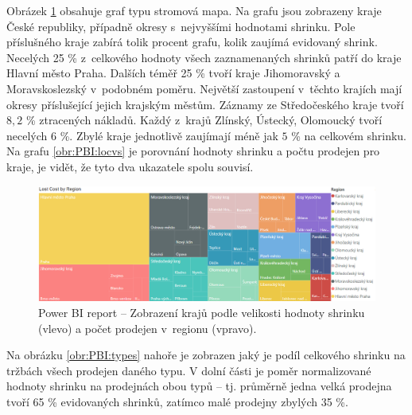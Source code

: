 Obrázek \ref*{obr:PBI:loc} obsahuje graf typu stromová mapa. Na grafu jsou zobrazeny kraje České republiky, případně okresy s~nejvyššími hodnotami shrinku. Pole příslušného kraje zabírá tolik procent grafu, kolik zaujímá evidovaný shrink. Necelých 25 \% z~celkového hodnoty všech zaznamenaných shrinků patří do kraje Hlavní město Praha. Dalších téměř 25 \% tvoří kraje Jihomoravský a Moravskoslezský v~podobném poměru. Největší zastoupení v~těchto krajích mají okresy příslušející jejich krajským městům. Záznamy ze Středočeského kraje tvoří $8{,}2$ \% ztracených nákladů. Každý z~krajů Zlínský, Ústecký, Olomoucký tvoří necelých $6$ \%. Zbylé kraje jednotlivě zaujímají méně jak $5$ \% na celkovém shrinku. Na grafu \ref*{obr:PBI:locvs} je porovnání hodnoty shrinku a počtu prodejen pro kraje, je vidět, že tyto dva ukazatele spolu souvisí.
\begin{figure}[h!]
    \centering
    \captionsetup{justification=centering}
    \includegraphics[width=\textwidth]{obrazky/PBI/location.png}
    \caption{Power BI report -- Zobrazení krajů podle velikosti hodnoty shrinku (vlevo) a počet prodejen v~regionu (vpravo).}
    \label{obr:PBI:loc}
\end{figure}

Na obrázku \ref*{obr:PBI:types} nahoře je zobrazen jaký je podíl celkového shrinku na tržbách všech prodejen daného typu. V dolní části je poměr normalizované hodnoty shrinku na prodejnách obou typů -- tj. průměrně jedna velká prodejna  tvoří 65 \% evidovaných shrinků, zatímco malé prodejny zbylých 35 \%.


